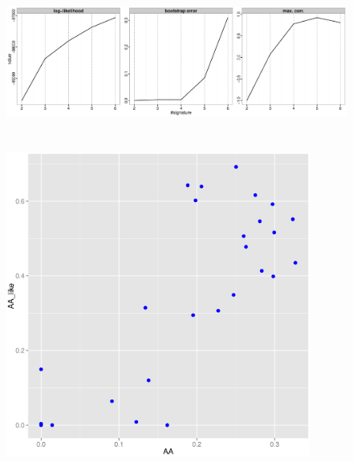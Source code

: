 \documentclass{article}
\begin{document}
\clearpage

\begin{figure}
\centering
\includegraphics[width=15cm,height=5cm]{UTUC_stat.eps}
\caption{}
\label{example_summary.pd}
\end{figure}

\clearpage

\begin{figure}
\centering
\includegraphics[width=10cm,height=10cm]{UTUC_AA_AAlike_cor.eps}
\caption{}
\label{example_signature.pd}
\end{figure}


\clearpage




\end{document}

